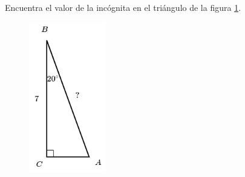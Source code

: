 Encuentra el valor de la incógnita en el triángulo de la figura \ref{fig:lados_functrig_18}.
\begin{figure}[H]
    \begin{center}
        \includegraphics[width=0.3\textwidth]{../images/lados_functrig_18.png}
    \end{center}
    \caption{}
    \label{fig:lados_functrig_18}
\end{figure}